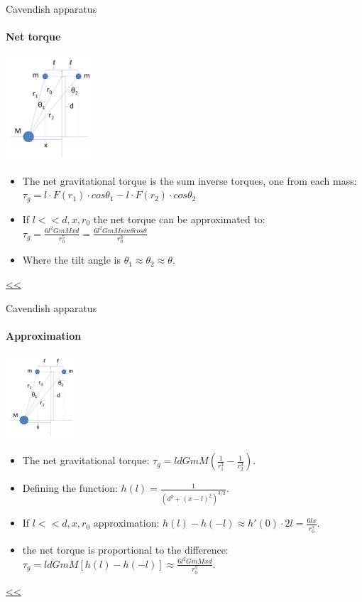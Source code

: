 \documentclass{beamer}
\begin{document}
\begin{frame}{\hypertarget{frame:Cavendish apparatus 1}{Cavendish apparatus}}
	\framesubtitle{Net torque}
	\begin{center}		
		\includegraphics[width=0.25\textwidth,keepaspectratio]{Cavendish apparatus.PNG}
    \end{center}
	\begin{itemize}
		\item The net gravitational torque is the sum inverse torques, one from each mass: $\tau_g = l \cdot F(r_1) \cdot cos\theta_1 - l \cdot F(r_2) \cdot cos\theta_2$
		\item If $l<<d,x,r_0$ the net torque can be approximated to: $\tau_g =  \frac{6l^2GmMxd} {r_0^5} = \frac{6l^2GmM sin\theta cos\theta}{r_0^3}$
		\item Where the tilt angle is $\theta_1 \approx \theta_2 \approx \theta$.
	\end{itemize}
	\hyperlink{frame:Cavendish apparatus}{<<} 
\end{frame}
\begin{frame}{Cavendish apparatus}
	\framesubtitle{Approximation}
	\begin{center}		
		\includegraphics[width=0.2\textwidth,keepaspectratio]{Cavendish apparatus.PNG}
    \end{center}
	\begin{itemize}
		\item The net gravitational torque: $\tau_g =  l d GmM(\frac{1}{r_1^3} - \frac{1}{r_2^3})$.
		\item Defining the function: $h(l) = \frac{1}{(d^2 +(x-l)^2)^{3/2}}$.
		\item If $l<<d,x,r_0$ approximation: $h(l)-h(-l)\approx h'(0)\cdot 2l = \frac{6lx}{r_0^5}$.
		\item the net torque is proportional to the difference: $\tau_g = l d GmM[h(l)-h(-l)]\approx \frac{6l^2GmMxd} {r_0^5}$.
	\end{itemize}
	\hyperlink{frame:Cavendish apparatus}{<<} 
\end{frame}
\end{document}
